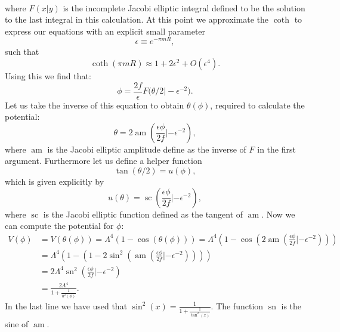 \documentclass[master,       %
               twoside,        %
               BCOR10mm,       %
               english,ngerman, %
               ]{GAUBM}
\newcommand{\todo}[1]{{\color{magenta}{#1}}}
\begin{document}
\begin{otherlanguage}{english}
\begin{align}
\end{align}
where $F(x|y)$ is the incomplete Jacobi elliptic integral defined to be the solution to the last integral in this calculation.
At this point we approximate the $\coth$ to express our equations with an explicit small parameter
\begin{equation}
	\epsilon \equiv e^{-\pi m R},
\end{equation}
such that
\begin{equation}
	\coth(\pi m R) \approx 1 + 2 \epsilon^2 + O(\epsilon^4).
\end{equation}
Using this we find that: \todo{(2 or sqrt 3 in numerotro???)}
\begin{equation}
	\phi = \frac{2 f}{\epsilon} F\big(\theta / 2 \big| - \epsilon^{-2} \big).
\end{equation}
Let us take the inverse of this equation to obtain $\theta(\phi)$, required to calculate the potential:
\begin{equation}
	\theta = 2 \operatorname{am}\left(\frac{\epsilon \phi}{2 f} | - \epsilon^{-2}\right),
\end{equation}
where $\operatorname{am}$ is the Jacobi elliptic amplitude define as the inverse of $F$ in the first argument.
Furthermore let us define a helper function
\begin{equation}
	\tan(\theta / 2) = u(\phi),
\end{equation}
which is given explicitly by
\begin{equation}
	u(\theta) = \operatorname{sc}(\frac{\epsilon \phi}{2 f} | - \epsilon^{-2}),
\end{equation}
where $\operatorname{sc}$ is the Jacobi elliptic function defined as the tangent of $\operatorname{am}$.
Now we can compute the potential for $\phi$:
\begin{align}
	V(\phi) &= V(\theta(\phi)) = \Lambda^4 (1 - \cos (\theta(\phi)))
	= \Lambda^4 ( 1 - \cos (2 \operatorname{am} ( \frac{\epsilon \phi}{2 f} | - \epsilon^{-2}) )) \nonumber \\
	&= \Lambda^4 ( 1 - (1 - 2 \sin^2( \operatorname{am}(\frac{\epsilon \phi}{2 f} | - \epsilon^{-2})))) \nonumber \\
	&= 2 \Lambda^4 \operatorname{sn}^2 ( \frac{\epsilon \phi}{2 f} | - \epsilon^{-2} ) \nonumber \\
	&= \frac{2 \Lambda^4}{1 + \frac{1}{u^2(\phi)}}.
\end{align}
In the last line we have used that $\sin^2(x) = \frac{1}{1 + \frac{1}{\tan^2(x)}}$. The function $\operatorname{sn}$ is the sine of $\operatorname{am}$.

\end{otherlanguage}
\end{document}
